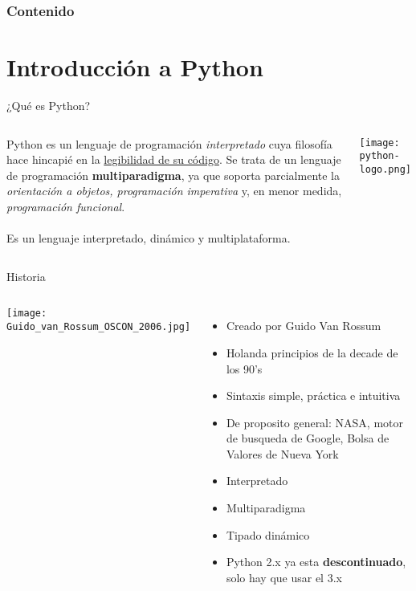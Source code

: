 {
\begin{frame}
    \frametitle{Contenido}
    \tableofcontents
\end{frame}
}

\section{Introducción a Python}

\begin{frame}[c]{¿Qué es Python?}
    \begin{columns}
        Python es un lenguaje de programación \textit{interpretado} cuya
        filosofía hace hincapié en la \underline{legibilidad de su código}.
        Se trata de un lenguaje de programación \textbf{multiparadigma}, ya
        que soporta parcialmente la \textit{orientación a objetos,
        programación imperativa} y, en menor medida, \textit{programación
        funcional}. \\~\\

        Es un lenguaje interpretado, dinámico y multiplataforma. 
        \begin{center}
            \texttt{[image: python-logo.png]}
        \end{center}
    \end{columns}
\end{frame}

\begin{frame}[c]{Historia}
  \begin{columns}
        \begin{center}
            \texttt{[image: Guido\_van\_Rossum\_OSCON\_2006.jpg]}
        \end{center}
    \begin{itemize}
      \item Creado por Guido Van Rossum
      \pausa
      \item Holanda principios de la decade de los 90's
      \pausa
      \item Sintaxis simple, práctica e intuitiva
      \pausa
      \item De proposito general: NASA, motor de busqueda de Google, Bolsa de
        Valores de Nueva York
      \pausa
      \item Interpretado
      \pausa
      \item Multiparadigma
      \pausa
      \item Tipado dinámico
      \pausa
      \item Python 2.x ya esta \textbf{descontinuado}, solo hay que usar el 3.x
    \end{itemize}
  \end{columns}
\end{frame}

